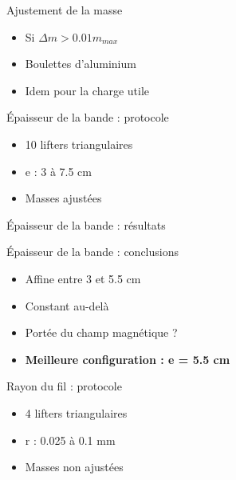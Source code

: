 \documentclass{beamer}
\begin{document}
		\begin{frame}{Ajustement de la masse}
			\begin{itemize}
				\item Si $\Delta m > 0.01m_{max}$
				\item Boulettes d'aluminium
				\item Idem pour la charge utile
			\end{itemize}
		\end{frame}
	
		\begin{frame}{Épaisseur de la bande : protocole}
			\begin{itemize}
				\item 10 lifters triangulaires
				\item e : 3 à 7.5 cm
				\item Masses ajustées
			\end{itemize}
		\end{frame}
	
		\begin{frame}{Épaisseur de la bande : résultats}
		\end{frame}
	
		\begin{frame}{Épaisseur de la bande : conclusions}
			\begin{itemize}
				\item Affine entre 3 et 5.5 cm
				\item Constant au-delà
				\item Portée du champ magnétique ?
				\item \textbf{Meilleure configuration : e = 5.5 cm}
			\end{itemize}
		\end{frame}
	
		\begin{frame}{Rayon du fil : protocole}
			\begin{itemize}
				\item 4 lifters triangulaires
				\item r : 0.025 à 0.1 mm
				\item Masses non ajustées
			\end{itemize}
		\end{frame}
	
\end{document}

